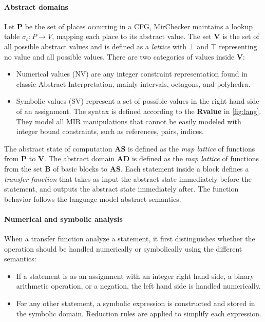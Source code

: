 \documentclass{article}
\begin{document}
\paragraph{Abstract domains}
Let \textbf{P} be the set of places  occurring in a CFG, MirChecker maintains a lookup table $\sigma_b : P \rightarrow V$, mapping each place 
to its abstract value. The set \textbf{V} is the set of all possible abstract values and is defined as a 
\textit{lattice} with $\bot$ and $\top$ representing no value and all possible values. There are two categories of values inside \textbf{V}: 
\begin{itemize}
    \item Numerical values (NV) are any integer constraint representation found in 
    classic Abstract Interpretation, mainly intervals, octagons, and polyhedra.
    \item Symbolic values (SV) represent a set of possible values in the right hand side of an assignment. The syntax is defined
    according to the \textbf{Rvalue} in \autoref{fig:lang}. They model  all MIR manipulations that cannot be easily modeled 
    with integer bound constraints, such as references, pairs, indices.
\end{itemize}

The abstract state of computation \textbf{AS} is defined as the \textit{map lattice} of functions from 
\textbf{P} to \textbf{V}. The abstract domain \textbf{AD} is defined as the \textit{map lattice} of functions from the set \textbf{B} of basic blocks to 
\textbf{AS}. Each statement inside a block defines a \textit{transfer function}
that takes as input the abstract state  immediately before the statement, and outputs the abstract state immediately after. The function behavior follows 
the language model abstract semantics.
\paragraph{Numerical and symbolic analysis}
When a transfer function analyze a statement, it first distinguishes whether
 the operation should be handled numerically or symbolically  using the different semantics:
\begin{itemize}
    \item If a statement is as an assignment with an integer right hand side, a binary arithmetic operation, or a negation, the left 
    hand side is handled numerically.
    \item For any other statement, a symbolic expression is constructed and stored in the symbolic domain. Reduction rules are applied 
    to simplify each expression.
\end{itemize}
\end{document}
